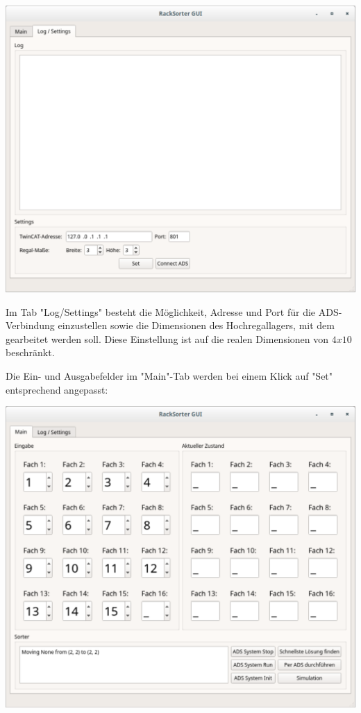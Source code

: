 \documentclass{fh-ium-bama}
\begin{document}
\begin{center}
\includegraphics[scale=0.4]{GUI2.pdf}
\end{center}
Im Tab "Log/Settings" besteht die Möglichkeit, Adresse und Port für die ADS-Verbindung einzustellen sowie die Dimensionen des Hochregallagers, mit dem gearbeitet werden soll. Diese Einstellung ist auf die realen Dimensionen von $4 x 10$ beschränkt.

Die Ein- und Ausgabefelder im "Main"-Tab werden bei einem Klick auf "Set" entsprechend angepasst:
\begin{center}
\includegraphics[scale=0.4]{GUI4.pdf}
\end{center}
\end{document}
